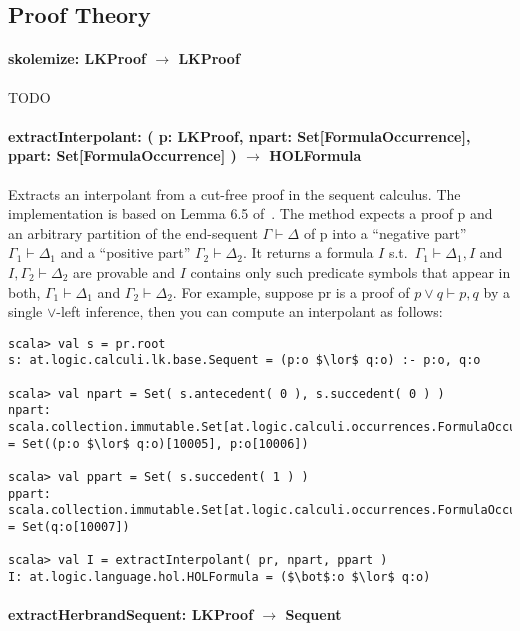 \documentclass[a4paper, 11pt]{report}
\newcommand{\seq}{\vdash}	%
\begin{document}
\subsection{Proof Theory}

\paragraph{\textbf{skolemize: LKProof $\rightarrow$ LKProof}}
{\color{red}TODO}

\paragraph{\textbf{extractInterpolant: ( p: LKProof, npart: Set[FormulaOccurrence],
ppart: Set[FormulaOccurrence] ) $\rightarrow$ HOLFormula}}

Extracts an interpolant from a cut-free proof in the sequent calculus. The
implementation is based on Lemma 6.5 of~\cite{Takeuti87Proof}. The method expects
a proof p and an arbitrary partition of the end-sequent $\Gamma \seq \Delta$ of p into a 
``negative part'' $\Gamma_1\seq\Delta_1$ and a ``positive part'' $\Gamma_2 \seq \Delta_2$.
It returns a formula $I$ s.t.\ $\Gamma_1\seq\Delta_1, I$ and $I,\Gamma_2\seq\Delta_2$
are provable and $I$ contains only such predicate symbols that appear in both, $\Gamma_1\seq\Delta_1$
and $\Gamma_2\seq\Delta_2$. For example, suppose pr is a proof of $p \lor q \seq p, q$
by a single $\lor$-left inference, then you can compute an interpolant as follows:
\begin{lstlisting}
scala> val s = pr.root
s: at.logic.calculi.lk.base.Sequent = (p:o $\lor$ q:o) :- p:o, q:o

scala> val npart = Set( s.antecedent( 0 ), s.succedent( 0 ) )
npart: scala.collection.immutable.Set[at.logic.calculi.occurrences.FormulaOccurrence] = Set((p:o $\lor$ q:o)[10005], p:o[10006])

scala> val ppart = Set( s.succedent( 1 ) )
ppart: scala.collection.immutable.Set[at.logic.calculi.occurrences.FormulaOccurrence] = Set(q:o[10007])

scala> val I = extractInterpolant( pr, npart, ppart )
I: at.logic.language.hol.HOLFormula = ($\bot$:o $\lor$ q:o)
\end{lstlisting}

\paragraph{\textbf{extractHerbrandSequent: LKProof $\rightarrow$ Sequent}}
\end{document}
